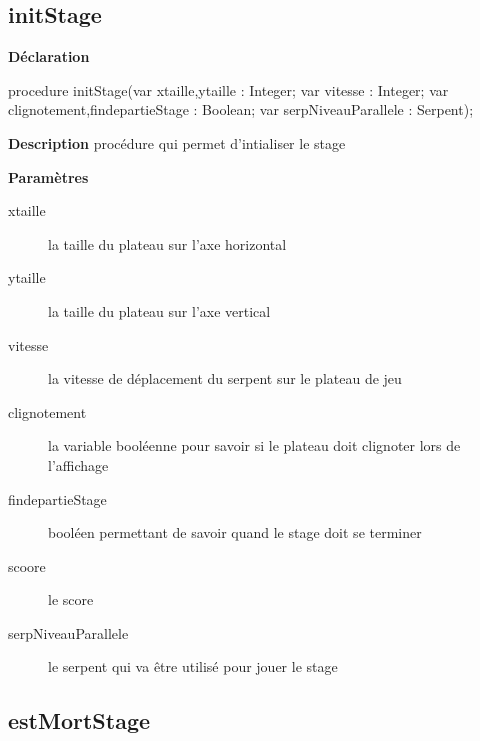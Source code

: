 \documentclass{report}
\newif\ifpdf
\begin{document}
\subsection*{initStage}
\fi
\label{Stage-initStage}
\begin{list}{}{
\setlength{\itemindent}{0cm}
\setlength{\listparindent}{0cm}
\setlength{\leftmargin}{\evensidemargin}
\addtolength{\leftmargin}{\tmplength}
\settowidth{\labelsep}{X}
\addtolength{\leftmargin}{\labelsep}
\setlength{\labelwidth}{\tmplength}
}
\item[\textbf{Déclaration}\hfill]
\ifpdf
\begin{flushleft}
\fi
\begin{ttfamily}
procedure initStage(var xtaille,ytaille : Integer; var vitesse : Integer; var clignotement,findepartieStage : Boolean; var serpNiveauParallele : Serpent);\end{ttfamily}

\ifpdf
\end{flushleft}
\fi

\par
\item[\textbf{Description}]
procédure qui permet d'intialiser le stage       \par
\item[\textbf{Paramètres}]
\begin{description}
\item[xtaille] la taille du plateau sur l'axe horizontal
\item[ytaille] la taille du plateau sur l'axe vertical
\item[vitesse] la vitesse de déplacement du serpent sur le plateau de jeu
\item[clignotement] la variable booléenne pour savoir si le plateau doit clignoter lors de l'affichage
\item[findepartieStage] booléen permettant de savoir quand le stage doit se terminer
\item[scoore] le score
\item[serpNiveauParallele] le serpent qui va être utilisé pour jouer le stage
\end{description}


\end{list}
\ifpdf
\subsection*{\large{\textbf{estMortStage}}\normalsize\hspace{1ex}\hrulefill}
\else
\end{document}
